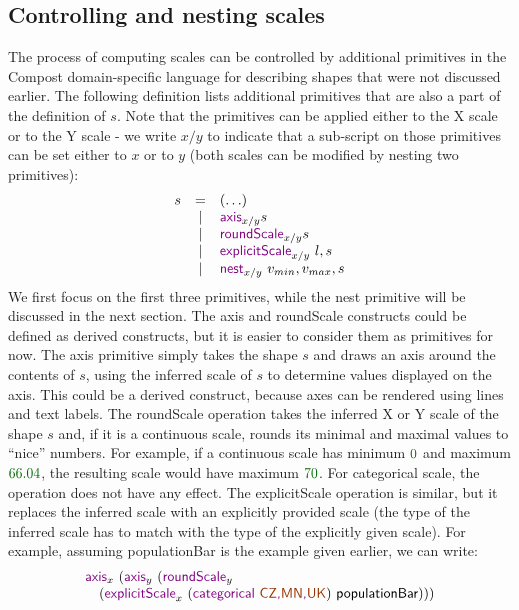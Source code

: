 \documentclass{jfp}
\newcommand{\num}[1]{\textcolor{numclr}{#1}}
\newcommand{\strf}[1]{\textnormal{\textcolor{strclr}{\sffamily #1}}}
\newcommand{\ident}[1]{\textnormal{\textcolor{idclr}{\sffamily #1}}}
\newcommand{\kvd}[1]{\textnormal{\textcolor{kvdclr}{\sffamily #1}}}
\begin{document}
\subsection*{Controlling and nesting scales}
The process of computing scales can be controlled by additional primitives in the Compost
domain-specific language for describing shapes that were not discussed earlier. The following
definition lists additional primitives that are also a part of the definition of $s$. Note that
the primitives can be applied either to the X scale or to the Y scale - we write $x/y$ to indicate
that a sub-script on those primitives can be set either to $x$ or to $y$ (both scales can be
modified by nesting two primitives):
%
\begin{equation*}
\begin{array}{rcl}
s & = & (\ldots)\\
 & | & \kvd{axis}_{x/y} s\\
 & | & \kvd{roundScale}_{x/y} s\\
 & | & \kvd{explicitScale}_{x/y}~l, s\\
 & | & \kvd{nest}_{x/y}~v_{min}, v_{max}, s
\end{array}
\end{equation*}
%
We first focus on the first three primitives, while the \kvd{nest} primitive will be discussed in
the next section. The \kvd{axis} and \kvd{roundScale} constructs could be defined as derived constructs,
but it is easier to consider them as primitives for now. The \kvd{axis} primitive simply takes the shape
$s$ and draws an axis around the contents of $s$, using the inferred scale of $s$ to determine values
displayed on the axis. This could be a derived construct, because axes can be rendered using lines
and text labels.
The \kvd{roundScale} operation takes the inferred X or Y scale of the shape $s$ and, if it is a
continuous scale, rounds its minimal and maximal values to ``nice'' numbers. For example, if a
continuous scale has minimum $\num{0}$ and maximum $\num{66.04}$, the resulting scale would have
maximum $\num{70}$. For categorical scale, the operation does not have any effect.
The \kvd{explicitScale} operation is similar, but it replaces the inferred scale with an explicitly
provided scale (the type of the inferred scale has to match with the type of the explicitly given
scale). For example, assuming \ident{populationBar} is the example given earlier, we can write:
%
\begin{equation*}
\begin{array}{l}
\kvd{axis}_x~(\kvd{axis}_y~(\kvd{roundScale}_y\\
\quad(\kvd{explicitScale}_x~(\kvd{categorical \strf{CZ},\strf{MN},\strf{UK}})~\ident{populationBar})))
\end{array}
\end{equation*}
\end{document}
